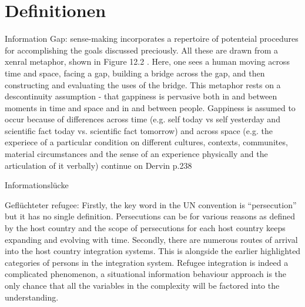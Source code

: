 \section{Definitionen}



Information Gap:
\cite{dervin2003sense}
sense-making incorporates a repertoire of potenteial procedures for accomplishing the goals discussed preciously. All these are drawn from a xenral metaphor, shown in Figure 12.2 \includegraphics[width=00.5]{SMM_MEtaphor.jpg}. Here, one sees a human moving across time and space, facing a gap, building a bridge across the gap, and then constructing and evaluating the uses of the bridge. This metaphor rests on a descontinuity assumption - that gappiness is pervasive both in and between moments in time and space and in and between people. Gappiness is assumed to occur because of differences across time (e.g. self today vs self yesterday and scientific fact today vs. scientific fact tomorrow) and across space (e.g. the experiece of a particular condition on different cultures, contexts, communites, material circumstances and the sense of an experience physically and the articulation of it verbally)
continue on Dervin p.238

Informationslücke

Geflüchteter
refugee:
Firstly, the key word in the UN convention is “persecution”
but it has no single definition. Persecutions can be for
various reasons as defined by the host country and the
scope of persecutions for each host country keeps
expanding and evolving with time. Secondly, there are
numerous routes of arrival into the host country integration
systems. This is alongside the earlier highlighted categories
of persons in the integration system. Refugee integration is
indeed a complicated phenomenon, a situational
information behaviour approach is the only chance that all
the variables in the complexity will be factored into the
understanding.

